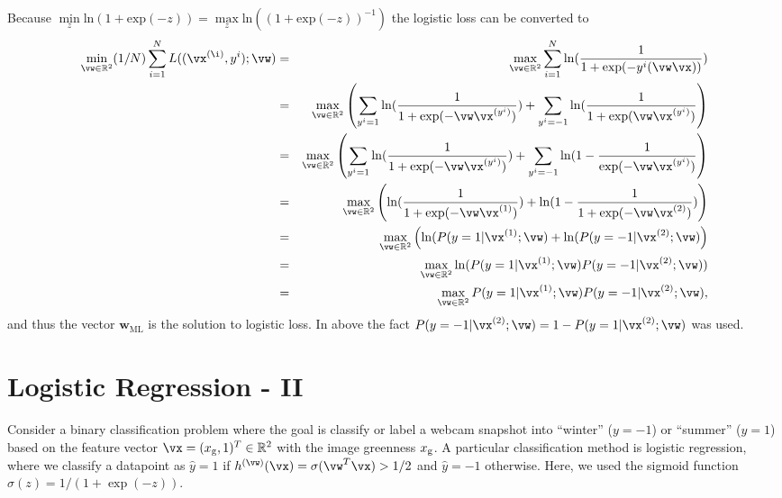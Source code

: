 \documentclass[article,11pt]{article}
\begin{document}
 
\\
Because $\min\limits_{z}\mathrm{ln}(1+\mathrm{exp}(-z)) = \max\limits_{z}\mathrm{ln}((1+\mathrm{exp}(-z))^{-1})$ the logistic loss can be converted to
\begin{eqnarray}
  \min\limits_{\vw \in \mathbb{R}^{2}} (1/N) \sum_{i=1}^{N} L((\vx^{(\i)},y^{i});\vw) &=&  \max\limits_{\vw \in \mathbb{R}^{2}}\sum_{i=1}^{N}\mathrm{ln}(\frac{1}{1+\mathrm{exp}(-y^i(\vw\vx))})\nonumber\\
  &=&\max\limits_{\vw \in \mathbb{R}^{2}}\left(\sum_{y^i=1}\mathrm{ln}(\frac{1}{1+\mathrm{exp}(-\vw\vx^{(y^i)})}) + \sum_{y^i=-1}\mathrm{ln}(\frac{1}{1+\mathrm{exp}(\vw\vx^{(y^i)})}\right)\nonumber\\
   &=&\max\limits_{\vw \in \mathbb{R}^{2}}\left(\sum_{y^i=1}\mathrm{ln}(\frac{1}{1+\mathrm{exp}(-\vw\vx^{(y^i)})}) + \sum_{y^i=-1}\mathrm{ln}(1-\frac{1}{\mathrm{exp}(-\vw\vx^{(y^i)})}\right)\nonumber\\
  &=&\max\limits_{\vw \in \mathbb{R}^{2}}\left(\mathrm{ln}(\frac{1}{1+\mathrm{exp}(-\vw\vx^{(1)})}) + \mathrm{ln}(1-\frac{1}{1+\mathrm{exp}(-\vw\vx^{(2)})})\right)\nonumber\\
  &=&\max\limits_{\vw \in \mathbb{R}^{2}}\left(\mathrm{ln}(P(y=1|\vx^{(1)};\vw) + \mathrm{ln}(P(y=-1|\vx^{(2)};\vw)\right)\nonumber\\
  &=&\max\limits_{\vw \in \mathbb{R}^{2}}\mathrm{ln}(P(y=1|\vx^{(1)};\vw)P(y=-1|\vx^{(2)};\vw))\nonumber\\
  &=&\max\limits_{\vw \in \mathbb{R}^{2}}P(y=1|\vx^{(1)};\vw)P(y=-1|\vx^{(2)};\vw)\nonumber,
  \label{eq:max_like}
\end{eqnarray}
and thus the vector $\mathbf{w}_{\mathrm{ML}}$ is the solution to logistic loss.
In above the fact $P(y=-1|\vx^{(2)};\vw) = 1 - P(y=1|\vx^{(2)};\vw)$ was used. 
\newpage

\section{Logistic Regression - II}
Consider a binary classification problem where the goal is classify or label a webcam snapshot into ``winter'' ($y=-1$) or ``summer'' ($y=1$) based on the feature vector 
$\vx=(x_{\rm g},1)^{T} \in \mathbb{R}^{2}$ with the image greenness $x_{\rm g}$. A particular classification 
method is logistic regression, where we classify a datapoint as $\hat{y}=1$ if $h^{(\vw)}(\vx)=\sigma(\vw^T\vx) > 1/2$ and $\hat{y}=-1$ otherwise. Here, we used the sigmoid function 
$\sigma(z) = 1/(1+\exp(-z))$. 
\end{document}
